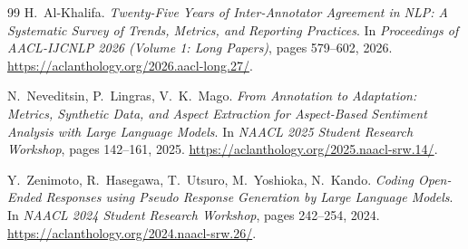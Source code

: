 \documentclass[11pt,a4paper]{article}
\begin{document}
\begin{thebibliography}{99}
H.~Al-Khalifa.
\newblock \emph{Twenty-Five Years of Inter-Annotator Agreement in NLP: A Systematic Survey of Trends, Metrics, and Reporting Practices}.
\newblock In \emph{Proceedings of AACL-IJCNLP 2026 (Volume 1: Long Papers)}, pages 579--602, 2026.
\newblock \url{https://aclanthology.org/2026.aacl-long.27/}.

N.~Neveditsin, P.~Lingras, V.~K.~Mago.
\newblock \emph{From Annotation to Adaptation: Metrics, Synthetic Data, and Aspect Extraction for Aspect-Based Sentiment Analysis with Large Language Models}.
\newblock In \emph{NAACL 2025 Student Research Workshop}, pages 142--161, 2025.
\newblock \url{https://aclanthology.org/2025.naacl-srw.14/}.

Y.~Zenimoto, R.~Hasegawa, T.~Utsuro, M.~Yoshioka, N.~Kando.
\newblock \emph{Coding Open-Ended Responses using Pseudo Response Generation by Large Language Models}.
\newblock In \emph{NAACL 2024 Student Research Workshop}, pages 242--254, 2024.
\newblock \url{https://aclanthology.org/2024.naacl-srw.26/}.

\end{thebibliography}
\end{document}
